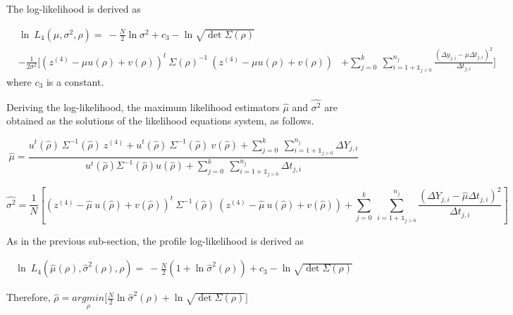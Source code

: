 \noindent The log-likelihood is derived as

\begin{align}
&\ln\ L_4\left(\mu,\sigma^2,\rho \right)=\ -\frac{N}{2} \ln \sigma^2 + c_3 - \ln \sqrt{\det \Sigma(\rho)} \nonumber\\
&-\frac{1}{2\sigma^2}\Bigg[(z^{(4)}-\mu u (\rho)+ v(\rho))^t \ \Sigma(\rho)^{-1} \ (z^{(4)}-\mu u(\rho) + v(\rho))
&+\sum\limits_{j=0}^{k}\ \sum\limits_{i=1+\mathds{1}_{j>0}}^{n_j} \frac{(\Delta y_{j,i}-\mu \Delta t_{j,i})^2}{\Delta t_{j,i}} \Bigg]
\label{eq:like_scheme4}
\end{align}
\noindent where $c_3$ is a constant.

\vspace{3mm}



\noindent Deriving the log-likelihood, the maximum likelihood estimators $\hat{\mu}$ and $\hat{\sigma^2}$ are obtained as the solutions of the likelihood equations system, as follows.


\begin{equation}
\hat{\mu}=\frac{u^t(\hat{\rho}) \ \Sigma^{-1}(\hat{\rho}) \ z^{(4)} + u^t(\hat{\rho}) \ \Sigma^{-1}(\hat{\rho}) \ v(\hat{\rho}) + \sum\limits_{j=0}^{k}\ \sum\limits _{i=1+\mathds{1}_{j>0}}^{n_j} \Delta Y_{j,i}}{u^t(\hat{\rho}) \Sigma^{-1}(\hat{\rho}) u(\hat{\rho})+ \sum\limits_{j=0}^{k}\ \sum\limits _{i=1+\mathds{1}_{j>0}}^{n_j}\Delta t_{j,i}}
\end{equation}


\begin{equation}
\hat{\sigma^2}=\frac{1}{N} \left[(z^{(4)}-\hat{\mu}\ u(\hat{\rho}) + v(\hat{\rho}))^t \ \Sigma^{-1}(\hat{\rho}) \ (z^{(4)}-\hat{\mu}\ u(\hat{\rho})+ v(\hat{\rho}))+ \sum\limits_{j=0}^{k}\ \sum\limits _{i=1+\mathds{1}_{j>0}}^{n_j}\frac{(\Delta Y_{j,i}-\hat{\mu}  \Delta t_{j,i})^2}{\Delta t_{j,i}} \right]
\end{equation}

\noindent As in the previous sub-section, the profile log-likelihood is derived as

\begin{align}
\ln\ L_4\left(\hat\mu(\rho),\hat\sigma^2(\rho),\rho \right)=\ -\frac{N}{2} (1+ \ln \hat\sigma^2(\rho)) + c_3 - \ln \sqrt{\det \Sigma(\rho)} 
\end{align}



\noindent Therefore, $\hat{\rho}=\underset{\rho}{argmin} \Bigg[ \frac{N}{2}  \ln \hat\sigma^2(\rho) + \ln \sqrt{\det \Sigma(\rho)} \Bigg]$



